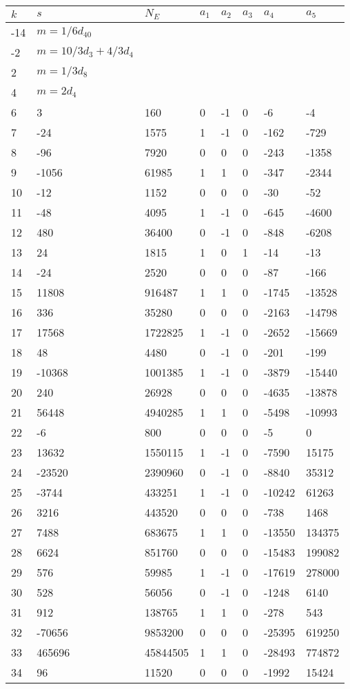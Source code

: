 \documentclass{amsart}
\begin{document}
\begin{longtable}{|l|l|l|lllll|}
\hline
$k$ & $s$ & $N_E$ & $a_1$ & $a_2$ & $a_3$ & $a_4$ & $a_5$\\
\hline
-14&$m=1/6d_{40}$&&\multicolumn{5}{c|}{}\\
-2&$m=10/3d_{3}+4/3d_{4}$&&\multicolumn{5}{c|}{}\\
2&$m=1/3d_{8}$&&\multicolumn{5}{c|}{}\\
4&$m=2d_{4}$&&\multicolumn{5}{c|}{}\\
6&3&160&0&-1&0&-6&-4\\
7&-24&1575&1&-1&0&-162&-729\\
8&-96&7920&0&0&0&-243&-1358\\
9&-1056&61985&1&1&0&-347&-2344\\
10&-12&1152&0&0&0&-30&-52\\
11&-48&4095&1&-1&0&-645&-4600\\
12&480&36400&0&-1&0&-848&-6208\\
13&24&1815&1&0&1&-14&-13\\
14&-24&2520&0&0&0&-87&-166\\
15&11808&916487&1&1&0&-1745&-13528\\
16&336&35280&0&0&0&-2163&-14798\\
17&17568&1722825&1&-1&0&-2652&-15669\\
18&48&4480&0&-1&0&-201&-199\\
19&-10368&1001385&1&-1&0&-3879&-15440\\
20&240&26928&0&0&0&-4635&-13878\\
21&56448&4940285&1&1&0&-5498&-10993\\
22&-6&800&0&0&0&-5&0\\
23&13632&1550115&1&-1&0&-7590&15175\\
24&-23520&2390960&0&-1&0&-8840&35312\\
25&-3744&433251&1&-1&0&-10242&61263\\
26&3216&443520&0&0&0&-738&1468\\
27&7488&683675&1&1&0&-13550&134375\\
28&6624&851760&0&0&0&-15483&199082\\
29&576&59985&1&-1&0&-17619&278000\\
30&528&56056&0&-1&0&-1248&6140\\
31&912&138765&1&1&0&-278&543\\
32&-70656&9853200&0&0&0&-25395&619250\\
33&465696&45844505&1&1&0&-28493&774872\\
34&96&11520&0&0&0&-1992&15424\\

\end{longtable}
\end{document}
